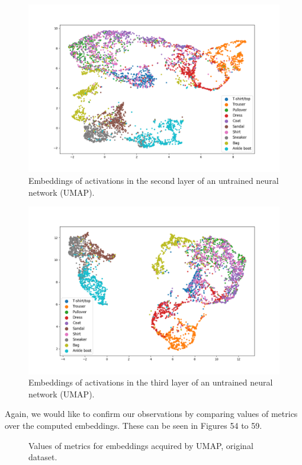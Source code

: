 \documentclass{article}
\begin{document}
\begin{figure}
  \centering
    \includegraphics[width=1.0\textwidth]{../../out/activations_cnn/fmnist/umap/untrained/plot_l2_f0.png}
    \caption{Embeddings of activations in the second layer of an untrained neural network (UMAP).}
\end{figure}

\begin{figure}
  \centering
    \includegraphics[width=1.0\textwidth]{../../out/activations_cnn/fmnist/umap/untrained/plot_l3.png}
    \caption{Embeddings of activations in the third layer of an untrained neural network (UMAP).}
\end{figure}

Again, we would like to confirm our observations by comparing values of
metrics over the computed embeddings. These can be seen in Figures 54 to
59.

\begin{figure}
  \centering
    \resizebox{\textwidth}{!}{
        
    }
  \caption{Values of metrics for embeddings acquired by UMAP, original dataset.}
\end{figure}
\end{document}
